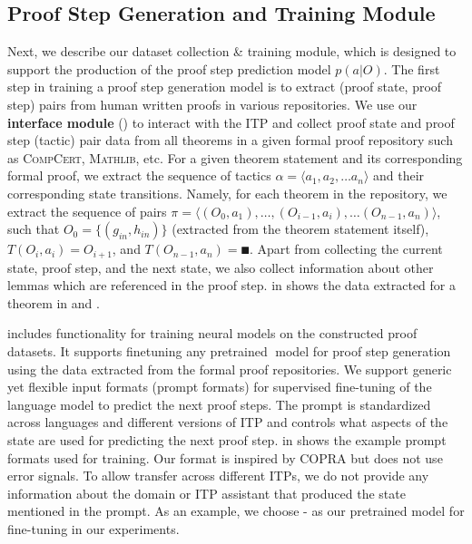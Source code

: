 \subsection{Proof Step Generation and Training Module}
\label{sec:training-module}
 Next, we describe our dataset collection \& training module, which is designed to support the production of the proof step prediction model $p(a | O)$. The first step in training a proof step generation model is to extract (proof state, proof step) pairs from human written proofs in various repositories. We use our \textbf{interface module} () to interact with the ITP and collect proof state and proof step (tactic) pair data from all theorems in a given formal proof repository such as \textsc{CompCert}, \textsc{Mathlib}, etc. For a given theorem statement and its corresponding formal proof, we extract the sequence of tactics $\alpha = \langle a_1, a_2, \dots a_n\rangle$ and their corresponding state transitions. Namely, for each theorem in the repository, we extract the sequence of pairs $\pi=\langle (O_0, a_1), \dots, (O_{i-1}, a_i), \dots (O_{n-1}, a_n)\rangle$, such that $O_0 = \{(g_{in}, h_{in})\}$ (extracted from the theorem statement itself), $T(O_i, a_i) = O_{i+1}$, and $T(O_{n-1}, a_n) = \QED$.  Apart from collecting the current state, proof step, and the next state, we also collect information about other lemmas which are referenced in the proof step.  in  shows the data extracted for a theorem in \coq\; and \lean{}.

\proofwala\; includes functionality for training neural models on the constructed proof datasets. It supports finetuning any pretrained \HuggingFace$\;$model for proof step generation using the data extracted from the formal proof repositories. We support generic yet flexible input formats (prompt formats) for supervised fine-tuning of the language model to predict the next proof steps. The prompt is standardized across languages and different versions of ITP and controls what aspects of the state are used for predicting the next proof step.  in  shows the example prompt formats used for training. Our format is inspired by COPRA \citep{thakur2024incontext} but does not use error signals. To allow transfer across different ITPs, we do not provide any information about the domain or ITP assistant that produced the state mentioned in the prompt. As an example, we choose \codeTFive-\base\; \citep{wang2021codet5} as our pretrained model for fine-tuning in our experiments.




